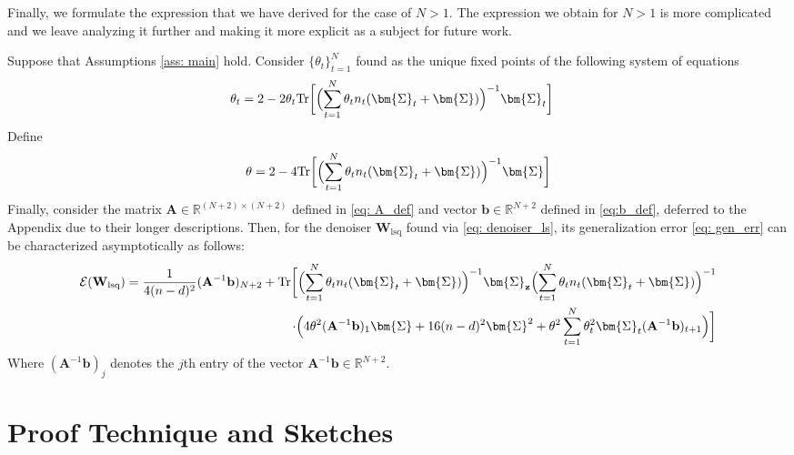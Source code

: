 \documentclass[final]{l4dc2026}
\newcommand{\bSigma}{\bm{\Sigma}}
\newcommand{\bA}{\mathbf{A}}
\newcommand{\bW}{\mathbf{W}}
\newcommand{\bb}{\mathbf{b}}
\newcommand{\bz}{\mathbf{z}}
\newcommand{\bbR}{\mathbb{R}}
\newcommand{\calE}{\mathcal{E}}
\newcommand{\tr}{\text{Tr}}
\begin{document}
Finally, we formulate the expression that we have derived for the case of $N>1$. The expression we obtain for $N>1$ is more complicated and we leave analyzing it further and making it more explicit as a subject for future work.
\begin{theorem}\label{thm: arb_N}
     Suppose that Assumptions \ref{ass: main} hold. Consider $\{\theta_t\}_{t=1}^N$ found as the unique fixed points of the following system of equations
    \begin{align*}
    \theta_t &= 2 - 2 \theta_t \tr \biggl[\Bigl(\sum_{t=1}^N \theta_t n_t (\bSigma_t + \bSigma) \Bigr)^{-1} \bSigma_t\biggr]
    \end{align*}
    Define $$\theta  = 2 -  4  \tr\biggl[\Bigl(\sum_{t=1}^N \theta_t n_t (\bSigma_t + \bSigma) \Bigr)^{-1} \bSigma\biggr]$$ 
    Finally, consider the matrix $\bA \in \bbR^{(N+2) \times (N+2)}$ defined in \eqref{eq: A_def} and vector $\bb \in \bbR^{N+2}$ defined in \eqref{eq:b_def}, deferred to the Appendix due to their longer descriptions. 
    Then, for the denoiser $\bW_{\text{lsq}}$ found via \eqref{eq: denoiser_ls}, its generalization error \eqref{eq: gen_err} can be characterized asymptotically as follows: 
    \begin{align*}
     \calE(\bW_{\text{lsq}}) = \frac{1}{4(n-d)^2} (\bA^{-1} \bb)_{N+2} +  \tr \biggl[ \Bigl(\sum_{t=1}^N \theta_t n_t (\bSigma_t + \bSigma) \Bigr)^{-1} \bSigma_{\bz}  \Bigl(\sum_{t=1}^N \theta_t n_t (\bSigma_t + \bSigma) \Bigr)^{-1} \\
    \cdot \Bigl( 4\theta^2 (\bA^{-1} \bb)_{1} \bSigma + 16(n-d)^2 \bSigma^2 + \theta^2 \sum_{t=1}^N \theta^2_t \bSigma_t (\bA^{-1} \bb)_{t+1}   \Bigr) \biggr]
    \end{align*}
    Where $(\bA^{-1} \bb)_j$ denotes the $j$th entry of the vector $\bA^{-1} \bb \in \bbR^{N+2}$.
\end{theorem}

\section{Proof Technique and Sketches}
\end{document}
